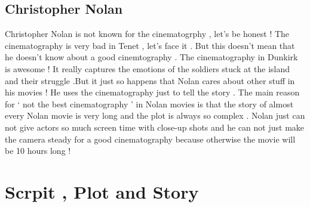 \documentclass[14pt]{article}
\begin{document}
	\subsection{Christopher Nolan}
		Christopher Nolan is not known for the cinematogrphy , let's be honest ! The cinematography is very bad in Tenet , let's face it . But this doesn't mean that he doesn't know about a good cinemtography . The cinematography in Dunkirk is awesome ! It really captures the emotions of the soldiers stuck at the island and their struggle .But it just so happens that Nolan cares about other stuff in his movies ! He uses the cinematography just to tell the story . The main reason for ` not the best cinematography ' in Nolan movies is that the story of almost every Nolan movie is very long and the plot is always so complex . Nolan just can not give actors so much screen time with close-up shots  and he can not just make the camera steady for a good cinematography because otherwise the movie will be 10 hours long ! 



\section{Scrpit , Plot and Story}
\end{document}
